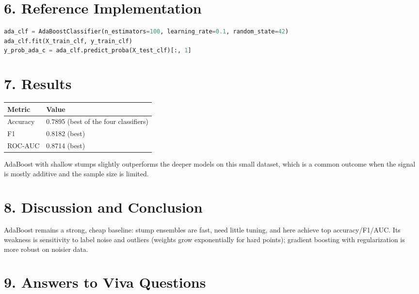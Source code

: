\section{6. Reference Implementation}\label{reference-implementation-3}

\begin{lstlisting}[language=Python]
ada_clf = AdaBoostClassifier(n_estimators=100, learning_rate=0.1, random_state=42)
ada_clf.fit(X_train_clf, y_train_clf)
y_prob_ada_c = ada_clf.predict_proba(X_test_clf)[:, 1]
\end{lstlisting}

\section{7. Results}\label{results-3}

{\def\LTcaptype{none} %
\begin{longtable}[]{@{}ll@{}}
\toprule\noalign{}
Metric & Value \\
\midrule\noalign{}
\endhead
\bottomrule\noalign{}
\endlastfoot
Accuracy & 0.7895 (best of the four classifiers) \\
F1 & 0.8182 (best) \\
ROC-AUC & 0.8714 (best) \\
\end{longtable}
}

AdaBoost with shallow stumps slightly outperforms the deeper models on
this small dataset, which is a common outcome when the signal is mostly
additive and the sample size is limited.

\section{8. Discussion and
Conclusion}\label{discussion-and-conclusion-3}

AdaBoost remains a strong, cheap baseline: stump ensembles are fast,
need little tuning, and here achieve top accuracy/F1/AUC. Its weakness
is sensitivity to label noise and outliers (weights grow exponentially
for hard points); gradient boosting with regularization is more robust
on noisier data.

\section{9. Answers to Viva
Questions}\label{answers-to-viva-questions-3}

